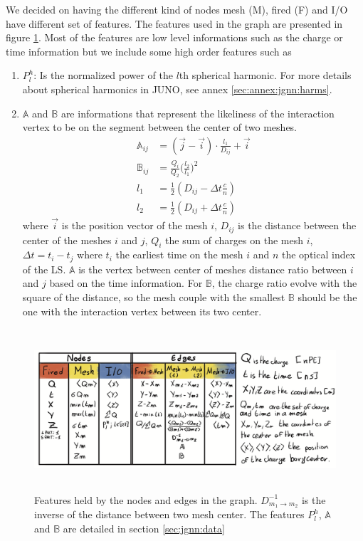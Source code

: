 \documentclass[../main.tex]{subfiles}
\begin{document}
We decided on having the different kind of nodes {\color{Dandelion} mesh (M)}, {\color{red} fired (F)} and {\color{blue} I/O} have different set of features. The features used in the graph are presented in figure \ref{fig:jgnn:graph_features}. Most of the features are low level informations such as the charge or time information but we include some high order features such as
\begin{enumerate}
  \item $P^h_l$: Is the normalized power of the $l$th spherical harmonic. For more details about spherical harmonics in JUNO, see annex \ref{sec:annex:jgnn:harms}.
  \item $\mathbb{A}$ and $\mathbb{B}$ are informations that represent the likeliness of the interaction vertex to be on the segment between the center of two meshes.
    \begin{align}
      \mathbb{A}_{ij} &= (\vec{j} - \vec{i})\cdot\frac{l_1}{D_{ij}} + \vec{i} \\
      \mathbb{B}_{ij} &= \frac{Q_i}{Q_2} \bigg(\frac{l_2}{l_1}\bigg)^2 \\
      l_1 &= \frac{1}{2}(D_{ij} - \Delta t \frac{c}{n}) \\
      l_2 &= \frac{1}{2}(D_{ij} + \Delta t \frac{c}{n})
    \end{align}
    where $\vec{i}$ is the position vector of the mesh $i$, $D_{ij}$ is the distance between the center of the meshes $i$ and $j$, $Q_i$ the sum of charges on the mesh $i$, $\Delta t = t_i - t_j$ where $t_i$ the earliest time on the mesh $i$ and $n$ the optical index of the LS. $\mathbb{A}$ is the vertex between center of meshes distance ratio between $i$ and $j$ based on the time information. For $\mathbb{B}$, the charge ratio evolve with the square of the distance, so the mesh couple with the smallest $\mathbb{B}$ should be the one with the interaction vertex between its two center.
\end{enumerate}

\begin{figure}[ht]
  \centering
  \includegraphics[height=6cm]{images/jgnn/graph_features.png}
  \caption{Features held by the nodes and edges in the graph. $D^{-1}_{m_1 \rightarrow m_2}$ is the inverse of the distance between two mesh center. The features $P^h_l$, $\mathbb{A}$ and $\mathbb{B}$ are detailed in section \ref{sec:jgnn:data}}
  \label{fig:jgnn:graph_features}
\end{figure}
\end{document}
